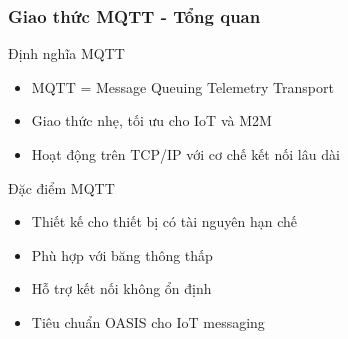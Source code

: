 \begin{frame}
\frametitle{Giao thức MQTT - Tổng quan}

\begin{block}{Định nghĩa MQTT}
\begin{itemize}
\item MQTT = Message Queuing Telemetry Transport
\item Giao thức nhẹ, tối ưu cho IoT và M2M
\item Hoạt động trên TCP/IP với cơ chế kết nối lâu dài
\end{itemize}
\end{block}

\begin{block}{Đặc điểm MQTT}
\begin{itemize}
\item Thiết kế cho thiết bị có tài nguyên hạn chế
\item Phù hợp với băng thông thấp
\item Hỗ trợ kết nối không ổn định
\item Tiêu chuẩn OASIS cho IoT messaging
\end{itemize}
\end{block}

\end{frame}

